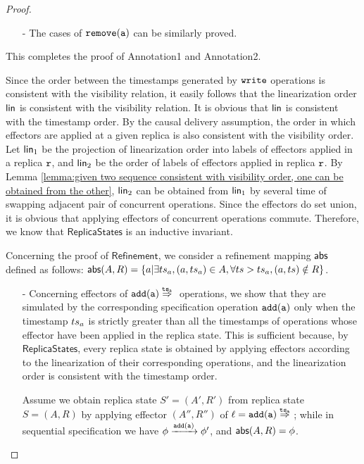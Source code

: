\begin {proof}
\begin{itemize}
\item[-] The cases of $\alabelshort[{\tt remove}]{a}$ can be similarly proved.
\end{itemize}

This completes the proof of Annotation1 and Annotation2.

Since the order between the timestamps generated by ${\tt write}$ operations is consistent with the visibility relation, it easily follows that the linearization order $\mathsf{lin}$ is consistent with the visibility relation. It is obvious that $\mathsf{lin}$ is consistent with the timestamp order. By the causal delivery assumption, the order in which effectors are applied at a given replica is also consistent with the visibility order. Let $\mathsf{lin}_1$ be the projection of linearization order into labels of effectors applied in a replica $\mathtt{r}$, and $\mathsf{lin}_2$ be the order of labels of effectors applied in replica $\mathtt{r}$. By Lemma \ref{lemma:given two sequence consistent with visibility order, one can be obtained from the other}, $\mathsf{lin}_2$ can be obtained from $\mathsf{lin}_1$ by several time of swapping adjacent pair of concurrent operations. Since the effectors do set union, it is obvious that applying effectors of concurrent operations commute. Therefore, we know that $\mathsf{ReplicaStates}$ is an inductive invariant.


Concerning the proof of $\mathsf{Refinement}$, we consider a refinement mapping $\mathsf{abs}$ defined as follows: $\mathsf{abs}(A,R) = \{ a \vert \exists ts_a, (a,ts_a) \in A, \forall ts > ts_a, (a,ts) \notin R \}$.

\begin{itemize}
\setlength{\itemsep}{0.5pt}
\item[-] Concerning effectors of $\alabellongind[{\tt add}]{a}{}{\ats_a}{}$ operations, we show that they are simulated by the corresponding specification operation $\alabelshort[{\tt add}]{a}$ only when the timestamp $ts_a$ is strictly greater than all the timestamps of operations whose effector have been applied in the replica state. This is sufficient because, by $\mathsf{ReplicaStates}$, every replica state is obtained by applying effectors according to the linearization of their corresponding operations, and the linearization order is consistent with the timestamp order.

    Assume we obtain replica state $S' = (A',R')$ from replica state $S = (A,R)$ by applying effector $(A'',R'')$ of $\alabel = \alabellongind[{\tt add}]{a}{}{\ats_a}{}$; while in sequential specification we have $\abstate \xrightarrow{\alabelshort[{\tt add}]{a}} \abstate'$, and $\mathsf{abs}(A,R) = \phi$.


\end{itemize}
\end{proof}
